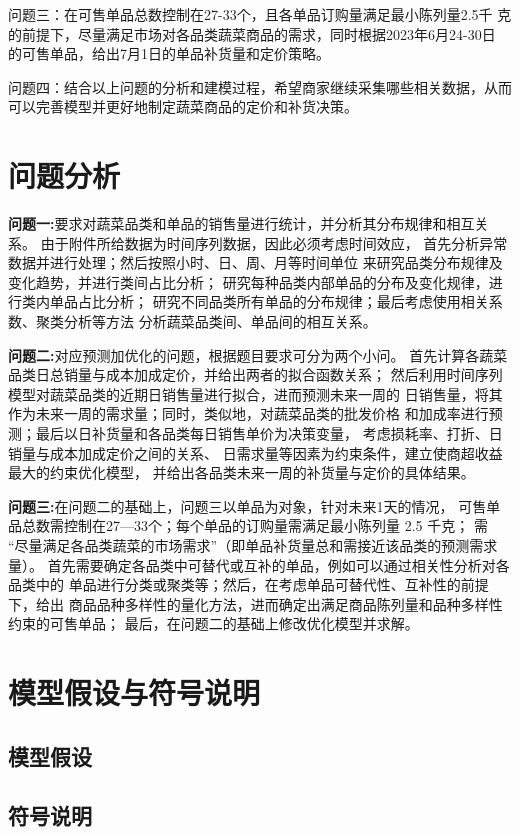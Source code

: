 \documentclass{cumcmthesis}
\begin{document}
问题三：在可售单品总数控制在27-33个，且各单品订购量满足最小陈列量2.5千
克的前提下，尽量满足市场对各品类蔬菜商品的需求，同时根据2023年6月24-30日
的可售单品，给出7月1日的单品补货量和定价策略。 

问题四：结合以上问题的分析和建模过程，希望商家继续采集哪些相关数据，从而
可以完善模型并更好地制定蔬菜商品的定价和补货决策。 


\section{问题分析}%
 \textbf{问题一:}要求对蔬菜品类和单品的销售量进行统计，并分析其分布规律和相互关系。
由于附件所给数据为时间序列数据，因此必须考虑时间效应，
首先分析异常数据并进行处理；然后按照小时、日、周、月等时间单位
来研究品类分布规律及变化趋势，并进行类间占比分析；
研究每种品类内部单品的分布及变化规律，进行类内单品占比分析；
研究不同品类所有单品的分布规律；最后考虑使用相关系数、聚类分析等方法
分析蔬菜品类间、单品间的相互关系。

\textbf{问题二:}对应预测加优化的问题，根据题目要求可分为两个小问。
首先计算各蔬菜品类日总销量与成本加成定价，并给出两者的拟合函数关系；
然后利用时间序列模型对蔬菜品类的近期日销售量进行拟合，进而预测未来一周的
日销售量，将其作为未来一周的需求量；同时，类似地，对蔬菜品类的批发价格
和加成率进行预测；最后以日补货量和各品类每日销售单价为决策变量，
考虑损耗率、打折、日销量与成本加成定价之间的关系、
日需求量等因素为约束条件，建立使商超收益最大的约束优化模型，
并给出各品类未来一周的补货量与定价的具体结果。

\textbf{问题三:}在问题二的基础上，问题三以单品为对象，针对未来1天的情况，
可售单品总数需控制在27—33个；每个单品的订购量需满足最小陈列量 2.5 千克；
需 “尽量满足各品类蔬菜的市场需求”（即单品补货量总和需接近该品类的预测需求量）。
首先需要确定各品类中可替代或互补的单品，例如可以通过相关性分析对各品类中的
单品进行分类或聚类等；然后，在考虑单品可替代性、互补性的前提下，给出
商品品种多样性的量化方法，进而确定出满足商品陈列量和品种多样性约束的可售单品；
最后，在问题二的基础上修改优化模型并求解。



\section{模型假设与符号说明}%
\subsection{模型假设}
\subsection{符号说明}
\end{document}

